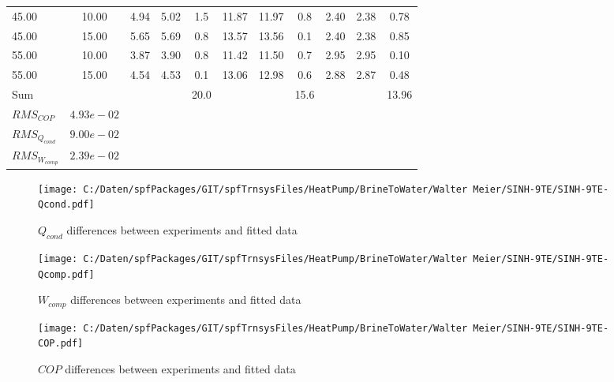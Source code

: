 \documentclass[english]{SPFShortReport}
\begin{document}
\begin{table}[!ht]
\begin{small}
\begin{center}
{\begin{tabular}{l | c c c c c c c c c c }
45.00  & 10.00 & 4.94 & 5.02 & 1.5 & 11.87 & 11.97 & 0.8 & 2.40 & 2.38 & 0.78\\ 
45.00  & 15.00 & 5.65 & 5.69 & 0.8 & 13.57 & 13.56 & 0.1 & 2.40 & 2.38 & 0.85\\ 
55.00  & 10.00 & 3.87 & 3.90 & 0.8 & 11.42 & 11.50 & 0.7 & 2.95 & 2.95 & 0.10\\ 
55.00  & 15.00 & 4.54 & 4.53 & 0.1 & 13.06 & 12.98 & 0.6 & 2.88 & 2.87 & 0.48\\ 
\hline 
 Sum &  & &  & 20.0 &  &  & 15.6 & &  & 13.96\\ 
\hline 
 $RMS_{COP}$ & $4.93e-02$ \\ 
 $RMS_{Q_{cond}}$ & $9.00e-02$ \\ 
 $RMS_{W_{comp}}$ & $2.39e-02$ \\ 
\hline
\hline
\end{tabular}
}
\label{ErrorsTable}
\end{center}
\end{small}
\end{table}
\begin{figure}[!ht]
\begin{center}
\texttt{[image: C:/Daten/spfPackages/GIT/spfTrnsysFiles/HeatPump/BrineToWater/Walter Meier/SINH-9TE/SINH-9TE-Qcond.pdf]}
\caption{$Q_{cond}$ differences between experiments and fitted data}
\label{QcongFig}
\end{center}
\end{figure}
\begin{figure}[!ht]
\begin{center}
\texttt{[image: C:/Daten/spfPackages/GIT/spfTrnsysFiles/HeatPump/BrineToWater/Walter Meier/SINH-9TE/SINH-9TE-Qcomp.pdf]}
\caption{$W_{comp}$ differences between experiments and fitted data}
\label{QcompFig}
\end{center}
\end{figure}
\begin{figure}[!ht]
\begin{center}
\texttt{[image: C:/Daten/spfPackages/GIT/spfTrnsysFiles/HeatPump/BrineToWater/Walter Meier/SINH-9TE/SINH-9TE-COP.pdf]}
\caption{$COP$ differences between experiments and fitted data}
\label{COPFig}
\end{center}
\end{figure}
\end{document}
